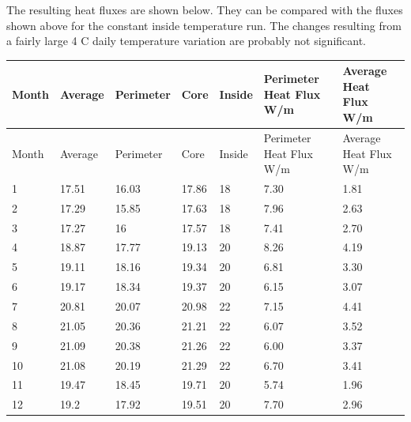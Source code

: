 The resulting heat fluxes are shown below. They can be compared with the fluxes shown above for the constant inside temperature run. The changes resulting from a fairly large 4 C daily temperature variation are probably not significant.

\begin{longtable}[c]{p{0.85in}p{0.85in}p{0.85in}p{0.85in}p{0.85in}p{0.85in}p{0.85in}}
\toprule 
Month & Average & Perimeter & Core & Inside & Perimeter Heat Flux W/m & Average Heat Flux W/m \tabularnewline \midrule
\endfirsthead

\toprule 
Month & Average & Perimeter & Core & Inside & Perimeter Heat Flux W/m & Average Heat Flux W/m \tabularnewline \midrule
\endhead
1 & 17.51 & 16.03 & 17.86 & 18 & 7.30 & 1.81 \tabularnewline
2 & 17.29 & 15.85 & 17.63 & 18 & 7.96 & 2.63 \tabularnewline
3 & 17.27 & 16 & 17.57 & 18 & 7.41 & 2.70 \tabularnewline
4 & 18.87 & 17.77 & 19.13 & 20 & 8.26 & 4.19 \tabularnewline
5 & 19.11 & 18.16 & 19.34 & 20 & 6.81 & 3.30 \tabularnewline
6 & 19.17 & 18.34 & 19.37 & 20 & 6.15 & 3.07 \tabularnewline
7 & 20.81 & 20.07 & 20.98 & 22 & 7.15 & 4.41 \tabularnewline
8 & 21.05 & 20.36 & 21.21 & 22 & 6.07 & 3.52 \tabularnewline
9 & 21.09 & 20.38 & 21.26 & 22 & 6.00 & 3.37 \tabularnewline
10 & 21.08 & 20.19 & 21.29 & 22 & 6.70 & 3.41 \tabularnewline
11 & 19.47 & 18.45 & 19.71 & 20 & 5.74 & 1.96 \tabularnewline
12 & 19.2 & 17.92 & 19.51 & 20 & 7.70 & 2.96 \tabularnewline
\bottomrule
\end{longtable}
